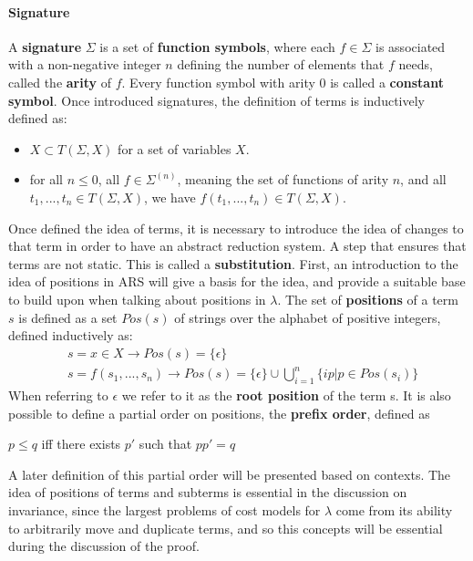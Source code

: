 \documentclass[12pt]{article}
\begin{document}
\paragraph{Signature} A \textbf{signature} $\Sigma$ is a set of \textbf{function symbols}, where each $f \in \Sigma$ is associated with a non-negative integer $n$ defining the number of elements that $f$ needs, called the \textbf{arity} of $f$. Every function symbol with arity 0 is called a \textbf{constant symbol}.
Once introduced signatures, the definition of terms is inductively defined as:
  \begin{itemize}
    \item $X \subset T( \Sigma , X )$ for a set of variables $X$.
    \item for all $n \leq 0$, all $f \in \Sigma^{(n)}$, meaning the set of functions of arity $n$, and all $t_{1}, ... , t_{n} \in T(\Sigma , X)$, we have $f(t_{1},...,t_{n}) \in T(\Sigma , X)$.
  \end{itemize}
  Once defined the idea of terms, it is necessary to introduce the idea of changes to that term in order to have an abstract reduction system. A step that ensures that terms are not static. This is called a \textbf{substitution}. First, an introduction to the idea of positions in ARS will give a basis for the idea, and provide a suitable base to build upon when talking about positions in $\lambda$.
  The set of \textbf{positions} of a term $s$ is defined as a set ${Pos}(s)$ of strings over the alphabet of positive integers, defined inductively as:
  \begin{equation}
    \begin{split}
  &s = x \in X \rightarrow Pos(s) = \{ \epsilon \} \\
  &s = f(s_{1},...,s_{n}) \rightarrow Pos(s) = \{ \epsilon \} \cup \bigcup_{i=1}^{n}\{ ip | p \in Pos(s_{i}) \}
    \end{split}
  \end{equation}
  When referring to $\epsilon$ we refer to it as the \textbf{root position} of the term s. It is also possible to define a partial order on positions, the \textbf{prefix order}, defined as
  \begin{center}
    $p \leq q$ iff there exists $p'$ such that $pp' = q$
  \end{center}
  A later definition of this partial order will be presented based on contexts.
  The idea of positions of terms and subterms is essential in the discussion on invariance, since the largest problems of cost models for $\lambda$ come from its ability to arbitrarily move and duplicate terms, and so this concepts will be essential during the discussion of the proof.
\end{document}
